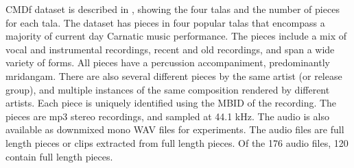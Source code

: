 \acrshort{CMDf} dataset is described in , showing the four \glspl{tala} and the number of pieces for each \gls{tala}. The dataset has pieces in four popular \glspl{tala} that encompass a majority of current day Carnatic music performance. The pieces include a mix of vocal and instrumental recordings, recent and old recordings, and span a wide variety of forms. All pieces have a percussion accompaniment, predominantly mridangam. There are also several different pieces by the same artist (or release group), and multiple instances of the same composition rendered by different artists. Each piece is uniquely identified using the \gls{MBID} of the recording. The pieces are mp3 stereo recordings, and sampled at 44.1 kHz. The audio is also available as downmixed mono WAV files for experiments. The audio files are full length pieces or clips extracted from full length pieces. Of the 176 audio files, 120 contain full length pieces. 

